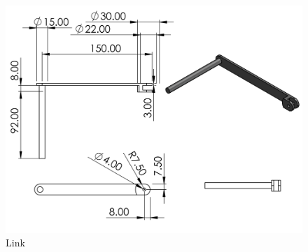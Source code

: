 \begin{enumerate}
\begin{figure}[H]
        \includegraphics [width=\textwidth]{Figures/RockerLink.PNG}
        \caption{Link}
        \label{fig:my_label}
    \end{figure}

\end{enumerate}
